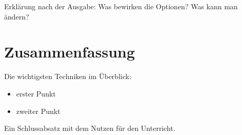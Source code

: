 Erklärung nach der Ausgabe: Was bewirken die Optionen? Was kann man ändern?



\section{Zusammenfassung}

Die wichtigsten Techniken im Überblick:

\begin{itemize}
	\item erster Punkt
	\item zweiter Punkt
\end{itemize}

Ein Schlussabsatz mit dem Nutzen für den Unterricht.


